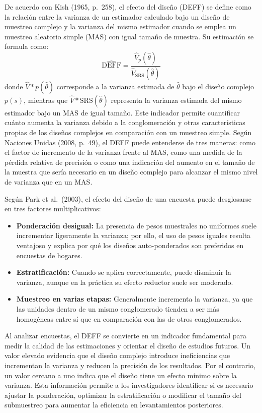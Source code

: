 \documentclass[
  spanish,
  12pt,
]{book}
\providecommand{\tightlist}{%
  \setlength{\itemsep}{0pt}\setlength{\parskip}{0pt}}
\begin{document}
De acuerdo con Kish (1965, p.~258), el efecto del diseño (DEFF) se define como la relación entre la varianza de un estimador calculado bajo un diseño de muestreo complejo y la varianza del mismo estimador cuando se emplea un muestreo aleatorio simple (MAS) con igual tamaño de muestra. Su estimación se formula como:
\[\widehat{\text{DEFF}} = \frac{\widehat{V}_{p}(\hat{\theta})}{\widehat{V}_{\text{SRS}}(\hat{\theta})}\]
donde
\(\widehat{V}*{p}(\hat{\theta})\) corresponde a la varianza estimada de \(\hat{\theta}\) bajo el diseño complejo \(p(s)\), mientras que \(\widehat{V}*{\text{SRS}}(\hat{\theta})\)
representa la varianza estimada del mismo estimador bajo un MAS de igual tamaño. Este indicador permite cuantificar cuánto aumenta la varianza debido a la conglomeración y otras características propias de los diseños complejos en comparación con un muestreo simple. Según Naciones Unidas (2008, p.~49), el DEFF puede entenderse de tres maneras: como el factor de incremento de la varianza frente al MAS, como una medida de la pérdida relativa de precisión o como una indicación del aumento en el tamaño de la muestra que sería necesario en un diseño complejo para alcanzar el mismo nivel de varianza que en un MAS.

Según Park et al.~(2003), el efecto del diseño de una encuesta puede desglosarse en tres factores multiplicativos:

\begin{itemize}
\tightlist
\item
  \textbf{Ponderación desigual:} La presencia de pesos muestrales no uniformes suele incrementar ligeramente la varianza; por ello, el uso de pesos iguales resulta ventajoso y explica por qué los diseños auto-ponderados son preferidos en encuestas de hogares.
\item
  \textbf{Estratificación:} Cuando se aplica correctamente, puede disminuir la varianza, aunque en la práctica su efecto reductor suele ser moderado.
\item
  \textbf{Muestreo en varias etapas:} Generalmente incrementa la varianza, ya que las unidades dentro de un mismo conglomerado tienden a ser más homogéneas entre sí que en comparación con las de otros conglomerados.
\end{itemize}

Al analizar encuestas, el DEFF se convierte en un indicador fundamental para medir la calidad de las estimaciones y orientar el diseño de estudios futuros. Un valor elevado evidencia que el diseño complejo introduce ineficiencias que incrementan la varianza y reducen la precisión de los resultados. Por el contrario, un valor cercano a uno indica que el diseño tiene un efecto mínimo sobre la varianza. Esta información permite a los investigadores identificar si es necesario ajustar la ponderación, optimizar la estratificación o modificar el tamaño del submuestreo para aumentar la eficiencia en levantamientos posteriores.
\end{document}
